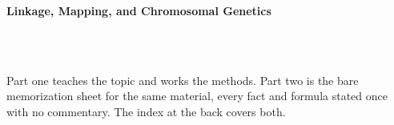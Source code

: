 



\makeindex[title={Index of This Volume},columns=2,intoc]

\begin{titlepage}\thispagestyle{empty}
\vspace*{0.14\textheight}
\noindent{\color{tiercore}\rule{\textwidth}{5pt}}\\[3pt]
\noindent{\color{bioline}\rule{\textwidth}{1pt}}\\[26pt]
\\[12pt]
\noindent\begin{minipage}{\textwidth}\raggedright
{\sffamily\bfseries\fontsize{28}{32}\selectfont\color{bioink}%
 \hyphenchar{} Linkage, Mapping, and Chromosomal Genetics\par}\end{minipage}\\[16pt]
\noindent{\color{biogreen}\rule{\textwidth}{1.4pt}}\\[10pt]
\noindent\begin{minipage}{\textwidth}\raggedright
{\fontsize{10.5}{14}\selectfont\color{biogreen}%
Part one teaches the topic and works the methods. Part two is the bare memorization sheet for the
same material, every fact and formula stated once with no commentary. The index at the back covers both.\par}\end{minipage}
\vfill
\noindent{\color{bioline}\rule{\textwidth}{1pt}}\\[3pt]
\noindent{\color{tiercore}\rule{\textwidth}{5pt}}
\end{titlepage}
\tableofcontents
\clearpage
{}
\clearpage
\printindex

